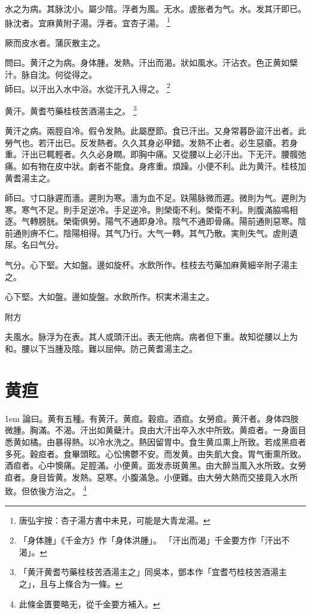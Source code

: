 水之为病。其脉沈小。屬少陰。浮者为風。无水。虗胀者为气。水。发其汗即已。脉沈者。宜麻黄附子湯。浮者。宜杏子湯。
	\footnote{
		唐弘宇按：杏子湯方書中未見，可能是大青龙湯。
	}

厥而皮水者。蒲灰散主之。

問曰。黄汗之为病。身体腫。发熱。汗出而渴。狀如風水。汗沾衣。色正黄如檗汁。脉自沈。何從得之。\\
師曰。以汗出入水中浴。水從汗孔入得之。
	\footnote{
		「身体腫」《千金方》作「身体洪腫」。
		「汗出而渴」千金要方作「汗出不渴」。
	}

黄汗。{\khaaitp 黄}耆芍{\khaaitp 藥}桂枝苦酒湯主之。
	\footnote{
		「黄汗黄耆芍藥桂枝苦酒湯主之」同吳本，鄧本作「宜耆芍桂枝苦酒湯主之」，且与上條合为一條。
	}

黄汗之病。兩脛自冷。假令发熱。此屬歷節。食已汗出。又身常暮{\khaaitp 卧}盜汗出者。此勞气也。若汗出已。反发熱者。久久其身必甲錯。发熱不止者。必生惡瘡。若身重。汗出已輒輕者。久久必身瞤。即胸中痛。又從腰以上必汗出。下无汗。腰髖弛痛。如有物在皮中狀。劇者不能食。身疼重。煩躁。小便不利。此为黄汗。桂枝加黄耆湯主之。

師曰。寸口脉遲而濇。遲則为寒。濇为血不足。趺陽脉微而遲。微則为气。遲則为寒。寒气不足。則手足逆冷。手足逆冷。則榮衛不利。榮衛不利。則腹滿脇鳴相逐。气轉膀胱。榮衛俱勞。陽气不通即身冷。陰气不通即骨痛。陽前通則惡寒。陰前通則痹不仁。陰陽相得。其气乃行。大气一轉。其气乃散。実則失气。虗則遺尿。名曰气分。

气分。心下堅。大如盤。邊如旋杯。水飲所作。桂枝去芍藥加麻{\khaaitp 黄細}辛附子湯主之。

心下堅。大如盤。邊如旋盤。水飲所作。枳{\khaaitp 実}术湯主之。

附方

夫風水。脉浮为在表。其人或頭汗出。表无他病。病者但下重。故知從腰以上为和。腰以下当腫及陰。難以屈伸。防己黄耆湯主之。

\chapter{黄疸}

\hangindent 1em
論曰。黄有五種。有黄汗。黄疸。穀疸。酒疸。女勞疸。黄汗者。身体四肢微腫。胸滿。不渴。汗出如黄蘗汁。良由大汗出卒入水中所致。黄疸者。一身面目悉黄如橘。由暴得熱。以冷水洗之。熱因留胃中。食生黄瓜熏上所致。若成黑疸者多死。穀疸者。食畢頭眩。心忪怫鬱不安。而发黄。由失飢大食。胃气衝熏所致。酒疸者。心中懊痛。足脛滿。小便黄。面发赤斑黄黑。由大醉当風入水所致。女勞疸者。身目皆黄。发熱。惡寒。小腹滿急。小便難。由大勞大熱而交接竟入水所致。但依後方治之。{\qianjin}
	\footnote{
		此條金匱要略无，從千金要方補入。
	}

